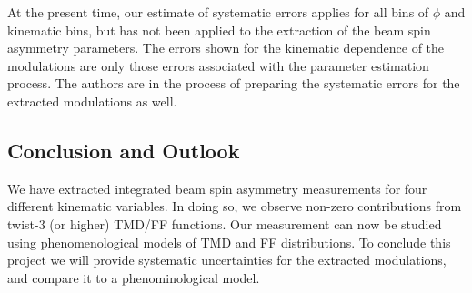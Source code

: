 At the present time, our estimate of systematic errors applies for all bins of $\phi$ and kinematic bins, but has not been applied to the extraction of the beam spin asymmetry parameters.  The errors shown for the kinematic dependence of the modulations are only those errors associated with the parameter estimation process.  The authors are in the process of preparing the systematic errors for the extracted modulations as well.
\subsection{Conclusion and Outlook}
We have extracted integrated beam spin asymmetry measurements for four different kinematic variables.  In doing so, we observe non-zero contributions from twist-3 (or higher) TMD/FF functions.  Our measurement can now be studied using phenomenological models of TMD and FF distributions.  To conclude this project we will provide systematic uncertainties for the extracted modulations, and compare it to a phenominological model.
